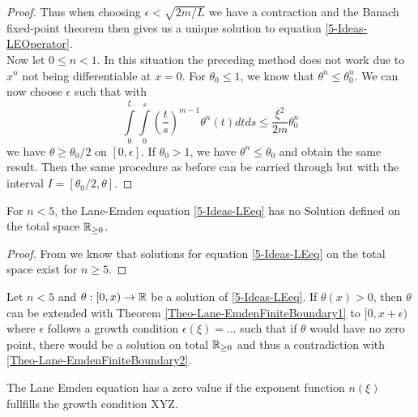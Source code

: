 \begin{proof}
	Thus when choosing $\epsilon<\sqrt{2m/L}$ we have a contraction and the Banach fixed-point theorem then gives us a unique solution to equation \ref{5-Ideas-LEOperator}.\\
	Now let $0\leq n<1$.
	In this situation the preceding method does not work due to $x^n$ not being differentiable at $x=0$. 
	For $\theta_0\leq1$, we know that $\theta^n\leq\theta_0^n$. We can now choose $\epsilon$ such that with
	\begin{equation}
		\int\limits_0^\xi\int\limits_0^s\left(\frac{t}{s}\right)^{m-1}\theta^n(t)dtds \leq \frac{\xi^2}{2m}\theta_0^n
	\end{equation}
	we have $\theta\geq\theta_0/2$ on $[0,\epsilon]$. If $\theta_0>1$, we have $\theta^n\leq\theta_0$ and obtain the same result. 
	Then the same procedure as before can be carried through but with the interval $I=[\theta_0/2,\theta]$.
\end{proof}
%
%
%
\begin{theorem}
	\label{Theo-Lane-EmdenFiniteBoundary2}
	For $n<5$, the Lane-Emden equation \ref{5-Ideas-LEeq} has no Solution defined on the total space $\mathbb{R}_{\geq0}$.
\end{theorem}
\begin{proof}
	From \cite{quittnerSuperlinearParabolicProblems2007a} we know that solutions for equation \ref{5-Ideas-LEeq} on the total space exist for $n\geq5$.
	
\end{proof}
%
%
%
\begin{theorem}
	\label{Theo-Lane-EmdenFiniteBoundary3}
	Let $n<5$ and $\theta:[0,x)\rightarrow\mathbb{R}$ be a solution of \ref{5-Ideas-LEeq}. If $\theta(x)>0$, then $\theta$ can be extended with Theorem \ref{Theo-Lane-EmdenFiniteBoundary1} 
	to $[0,x+\epsilon)$ where $\epsilon$ follows a growth condition $\epsilon(\xi)=...$ such that if $\theta$ would have no zero point, there would be a solution on total 
	$\mathbb{R}_{\geq0}$ and thus a contradiction with \ref{Theo-Lane-EmdenFiniteBoundary2}.
\end{theorem}
\begin{theorem}
	The Lane Emden equation has a zero value if the exponent function $n(\xi)$ fullfills the growth condition XYZ.
\end{theorem}

